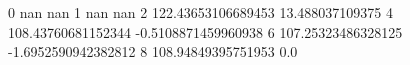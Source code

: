 0 nan nan
1 nan nan
2 122.43653106689453 13.488037109375
4 108.43760681152344 -0.5108871459960938
6 107.25323486328125 -1.6952590942382812
8 108.94849395751953 0.0
